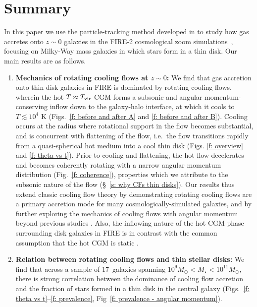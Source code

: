 \documentclass[fleqn,usenatbib]{mnras}
\newcommand{\Nsample}{17}
\begin{document}
\section{Summary}
\label{s: conclusions}

In this paper we use the particle-tracking method developed in \cite{Hafen2019,Hafen2020} to study how gas accretes onto $z\sim0$ galaxies in the FIRE-2 cosmological zoom simulations~\citep{Hopkins2018}, focusing on Milky-Way mass galaxies in which stars form in a thin disk. 
Our main results are as follows.
\begin{enumerate}
    \item \textbf{Mechanics of rotating cooling flows at $z \sim 0$:}
    We find that gas accretion onto thin disk galaxies in FIRE is dominated by rotating cooling flows, wherein the hot $T\approx T_{\rm vir}$ CGM forms a subsonic and angular momentum-conserving inflow down to the galaxy-halo interface, at which it cools to $T\lesssim10^4$ K (Figs.~\ref{f: before and after A} and \ref{f: before and after B}).
    Cooling occurs at the radius where rotational support in the flow becomes substantial, and is concurrent with flattening of the flow, i.e.~the flow transitions rapidly from a quasi-spherical hot medium into a cool thin disk (Figs. \ref{f: overview} and \ref{f: theta vs t}).
    Prior to cooling and flattening, the hot flow decelerates and becomes coherently rotating with a narrow angular momentum distribution (Fig.~\ref{f: coherence}), properties which we attribute to the subsonic nature of the flow (\S~\ref{s: why CFs thin disks}).
    Our results thus extend classic cooling flow theory by demonstrating rotating cooling flows are a primary accretion mode for many cosmologically-simulated galaxies, and by further exploring the mechanics of cooling flows with angular momentum beyond previous studies \citep{Cowie1980, Stern2020}.
    Also, the inflowing nature of the hot CGM phase surrounding disk galaxies in FIRE is in contrast with the common assumption that the hot CGM is static  \citep[e.g.,][]{Maller2004,Sharma2012, Voit2017, Faerman2017,Faerman2020}.\\ 
    \item \textbf{Relation between rotating cooling flows and thin stellar disks:}
    We find that across a sample of \Nsample~galaxies spanning $10^9 M_\odot < M_\star < 10^{11} M_\odot$, there is strong correlation between the dominance of cooling flow accretion and the fraction of stars formed in a thin disk in the central galaxy (Figs.~\ref{f: theta vs t}--\ref{f: prevalence}, Fig~\ref{f: prevalence - angular momentum}).

\end{enumerate}
\end{document}
